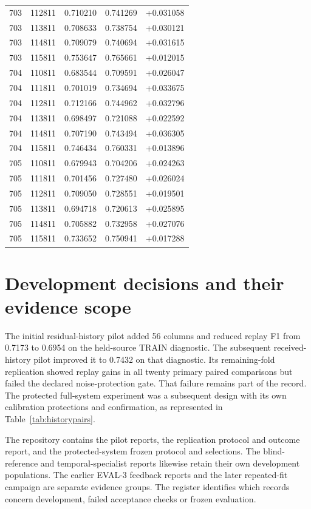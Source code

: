\begin{longtable}{@{}rrrrr@{}}
703 & 112811 & 0.710210 & 0.741269 & +0.031058\\
703 & 113811 & 0.708633 & 0.738754 & +0.030121\\
703 & 114811 & 0.709079 & 0.740694 & +0.031615\\
703 & 115811 & 0.753647 & 0.765661 & +0.012015\\
704 & 110811 & 0.683544 & 0.709591 & +0.026047\\
704 & 111811 & 0.701019 & 0.734694 & +0.033675\\
704 & 112811 & 0.712166 & 0.744962 & +0.032796\\
704 & 113811 & 0.698497 & 0.721088 & +0.022592\\
704 & 114811 & 0.707190 & 0.743494 & +0.036305\\
704 & 115811 & 0.746434 & 0.760331 & +0.013896\\
705 & 110811 & 0.679943 & 0.704206 & +0.024263\\
705 & 111811 & 0.701456 & 0.727480 & +0.026024\\
705 & 112811 & 0.709050 & 0.728551 & +0.019501\\
705 & 113811 & 0.694718 & 0.720613 & +0.025895\\
705 & 114811 & 0.705882 & 0.732958 & +0.027076\\
705 & 115811 & 0.733652 & 0.750941 & +0.017288\\
\bottomrule\end{longtable}

\section{Development decisions and their evidence scope}
The initial residual-history pilot added 56 columns and reduced replay F1 from 0.7173 to 0.6954 on the held-source TRAIN diagnostic. The subsequent received-history pilot improved it to 0.7432 on that diagnostic. Its remaining-fold replication showed replay gains in all twenty primary paired comparisons but failed the declared noise-protection gate. That failure remains part of the record. The protected full-system experiment was a subsequent design with its own calibration protections and confirmation, as represented in Table~\ref{tab:historypairs}.

The repository contains the pilot reports, the replication protocol and outcome report, and the protected-system frozen protocol and selections. The blind-reference and temporal-specialist reports likewise retain their own development populations. The earlier EVAL-3 feedback reports and the later repeated-fit campaign are separate evidence groups. The register identifies which records concern development, failed acceptance checks or frozen evaluation.

